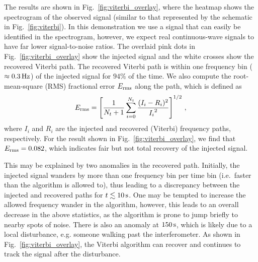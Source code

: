 \documentclass[paper-main.tex]{subfiles}
\begin{document}
The results are shown in Fig.~\ref{fig:viterbi_overlay}, where the heatmap shows the spectrogram of the observed signal (similar to that represented by the schematic in Fig.~\ref{fig:viterbi}). 
In this demonstration we use a signal that can easily be identified in the spectrogram, however, we expect real continuous-wave signals to have far lower signal-to-noise ratios. 
The overlaid pink dots in Fig.~\ref{fig:viterbi_overlay} show the injected signal and the white crosses show the recovered Viterbi path.
The recovered Viterbi path is within one frequency bin ($\approx 0.3\,{\rm Hz}$) of the injected signal for $94\%$ of the time. We also compute the root-mean-square (RMS) fractional error $E_{\rm rms}$ along the path, which is defined as 
\begin{equation}
E_{\rm rms} = \left[ \frac{1}{N_t+1} \sum_{i=0}^{N_t} \frac{(I_i - R_i)^2}{{I_i}^2} \right] ^{1/2}\,,
\end{equation}
where $I_i$ and $R_i$ are the injected and recovered (Viterbi) frequency paths, respectively. 
For the result shown in Fig.~\ref{fig:viterbi_overlay}, we find that $E_{\rm rms} = 0.082$, which indicates fair but not total recovery of the injected signal.


This may be explained by two anomalies in the recovered path. Initially, the injected signal wanders by more than one frequency bin per time bin (i.e.\ faster than the algorithm is allowed to), thus leading to a discrepancy between the injected and recovered paths for $t\lesssim 10\,{\rm s}$. One may be tempted to increase the allowed frequency wander in the algorithm, however, this leads to an overall decrease in the above statistics, as the algorithm is prone to jump briefly to nearby spots of noise. There is also an anomaly at $150\,{\rm s}$, which is likely due to a local disturbance, e.g. someone walking past the interferometer. 
As shown in Fig.~\ref{fig:viterbi_overlay}, the Viterbi algorithm can recover and continues to track the signal after the disturbance. 
\end{document}
